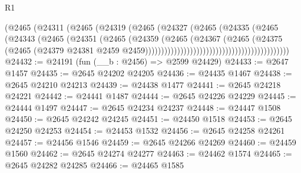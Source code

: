 \begin{lexlean}{R1}
\begin{coremodule}
                                                      (@2465
                                                        (@24311
                                                          (@2465
                                                            (@24319
                                                              (@2465
                                                                (@24327
                                                                  (@2465
                                                                    (@24335
                                                                      (@2465
                                                                        (@24343
                                                                          (@2465
                                                                            (@24351
                                                                              (@2465
                                                                                (@24359
                                                                                  (@2465
                                                                                    (@24367
                                                                                      (@2465
                                                                                        (@24375
                                                                                          (@2465
                                                                                            (@24379
                                                                                              @24381
                                                                                              @2459
                                                                                              @2459)))))))))))))))))))))))))))))))))))))))))))))
@24432 := @24191 (fun (__b : @2456) => @2599 @24429)
@24433 := @2647 @1457
@24435 := @2645 @24202 @24205
@24436 := @24435 @1467
@24438 := @2645 @24210 @24213
@24439 := @24438 @1477
@24441 := @2645 @24218 @24221
@24442 := @24441 @1487
@24444 := @2645 @24226 @24229
@24445 := @24444 @1497
@24447 := @2645 @24234 @24237
@24448 := @24447 @1508
@24450 := @2645 @24242 @24245
@24451 := @24450 @1518
@24453 := @2645 @24250 @24253
@24454 := @24453 @1532
@24456 := @2645 @24258 @24261
@24457 := @24456 @1546
@24459 := @2645 @24266 @24269
@24460 := @24459 @1560
@24462 := @2645 @24274 @24277
@24463 := @24462 @1574
@24465 := @2645 @24282 @24285
@24466 := @24465 @1585

\end{coremodule}
\end{lexlean}

